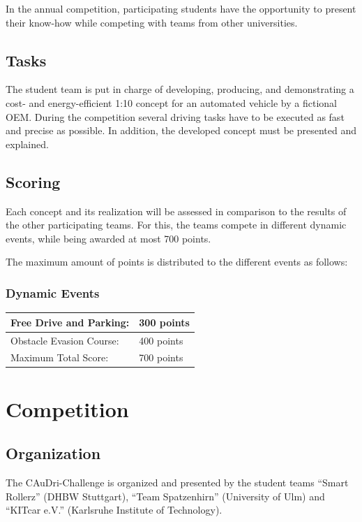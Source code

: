 \documentclass[a4paper]{report}
\begin{document}
In the annual competition, participating students have the opportunity to present their know-how while competing with teams from other universities. 

\section{Tasks}

The student team is put in charge of developing, producing, and demonstrating a cost- and energy-efficient 1:10 concept for an automated vehicle by a fictional OEM. During the competition several driving tasks have to be executed as fast and precise as possible. In addition, the developed concept must be presented and explained. 

\section{Scoring}

Each concept and its realization will be assessed in comparison to the results of the other participating teams. For this, the teams compete in different dynamic events, while being awarded at most 700 points. 

The maximum amount of points is distributed to the different events as follows: 

\subsection{Dynamic Events}

\begin{table}[h]
\begin{tabular}{|l|l|}
\hline
Free Drive and Parking:  & 300 points \\ \hline
Obstacle Evasion Course: & 400 points \\ \hline\hline
Maximum Total Score:     & 700 points \\ \hline
\end{tabular}
\end{table}

\chapter{Competition}

\section{Organization}

The CAuDri-Challenge is organized and presented by the student teams “Smart Rollerz” (DHBW Stuttgart), “Team Spatzenhirn” (University of Ulm) and “KITcar e.V.” (Karlsruhe Institute of Technology). 
\end{document}
